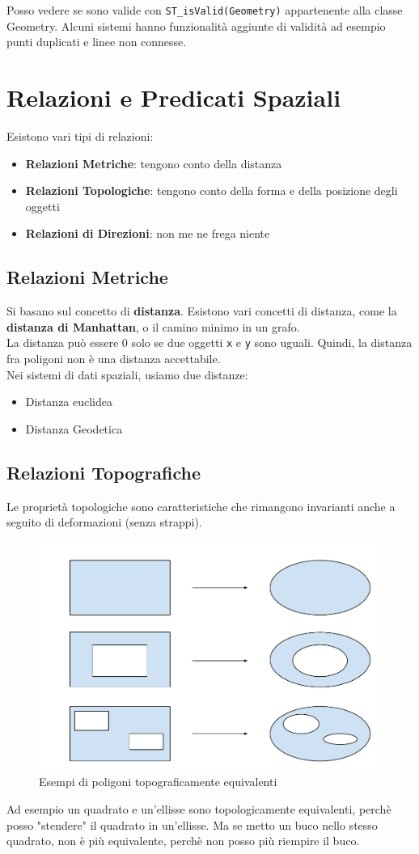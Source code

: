 \documentclass[a4paper,12pt]{article}
\begin{document}
Posso vedere se sono valide con \texttt{ST\_isValid(Geometry)} appartenente alla classe Geometry. Alcuni sistemi hanno funzionalità aggiunte di validità ad esempio punti duplicati e linee non connesse.

\section{Relazioni e Predicati Spaziali}
Esistono vari tipi di relazioni:
\begin{itemize}
\item \textbf{Relazioni Metriche}: tengono conto della distanza
\item \textbf{Relazioni Topologiche}: tengono conto della forma e della posizione degli oggetti
\item \textbf{Relazioni di Direzioni}: non me ne frega niente
\end{itemize}

\subsection{Relazioni Metriche}
Si basano sul concetto di \textbf{distanza}. Esistono vari concetti di distanza, come la \textbf{distanza di Manhattan}, o il camino minimo in un grafo.\\
La distanza può essere 0 solo se due oggetti \texttt{x} e \texttt{y} sono uguali. Quindi, la distanza fra poligoni non è una distanza accettabile.\\
Nei sistemi di dati spaziali, usiamo due distanze:
\begin{itemize}
\item Distanza euclidea
\item Distanza Geodetica
\end{itemize}

\subsection{Relazioni Topografiche}
Le proprietà topologiche sono caratteristiche che rimangono invarianti anche a seguito di deformazioni (senza strappi).
\begin{figure}[H]
	\centering
	\includegraphics[width=0.5\linewidth]{Immagini/poliTopo}
	\caption{Esempi di poligoni topograficamente equivalenti}
\end{figure}
Ad esempio un quadrato e un'ellisse sono topologicamente equivalenti, perchè posso "stendere" il quadrato in un'ellisse. Ma se metto un buco nello stesso quadrato, non è più equivalente, perchè non posso più riempire il buco.
\end{document}
